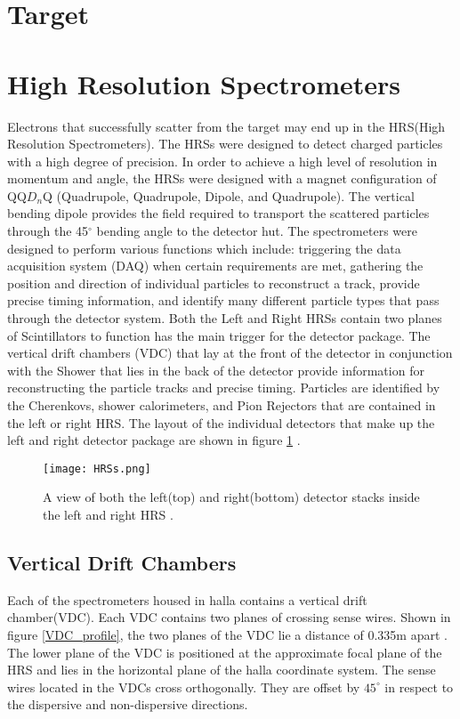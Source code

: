 \section{Target}

\section{High Resolution Spectrometers}
Electrons that successfully scatter from the target may end up in the HRS(High Resolution Spectrometers). The HRSs were designed to detect charged particles with a high degree of precision. In order to achieve a high level of resolution in momentum and angle, the HRSs were designed with a magnet configuration of QQ$D_n$Q (Quadrupole, Quadrupole, Dipole, and Quadrupole). The vertical bending dipole provides the field required to transport the scattered particles through the 45$^\circ$ bending angle to the detector hut. The spectrometers were designed to perform various functions which include: triggering the data acquisition system (DAQ) when certain requirements are met, gathering the position and direction of individual particles to reconstruct a track, provide precise timing information, and identify many different particle types that pass through the detector system. Both the Left and Right HRSs contain two planes of Scintillators to function has the main trigger for the detector package. The vertical drift chambers (VDC) that lay at the front of the detector in conjunction with the Shower that lies in the back of the detector provide information for reconstructing the particle tracks and precise timing. Particles are identified by the Cherenkovs, shower calorimeters, and Pion Rejectors that are contained in the left or right HRS. The layout of the individual detectors that make up the left and right detector package are shown in figure \ref{hrsss}  \cite{HallA}.

\begin{figure}
\centering

\texttt{[image: HRSs.png]}

\caption{A view of both the left(top) and right(bottom) detector stacks inside the left and right HRS \cite{HallA}.
\label{hrsss}}
\end{figure}


	\subsection{Vertical Drift Chambers}
	Each of the spectrometers housed in halla contains a vertical drift chamber(VDC). Each VDC contains two planes of crossing sense wires. Shown in figure \ref{VDC_profile}, the two planes of the VDC lie a distance of 0.335m apart \cite{drift}. The lower plane of the VDC is positioned at the approximate focal plane of the HRS and lies in the horizontal plane of the halla coordinate system. The sense wires located in the VDCs cross orthogonally. They are offset by $45^\circ$ in respect to the dispersive and non-dispersive directions. 
	
